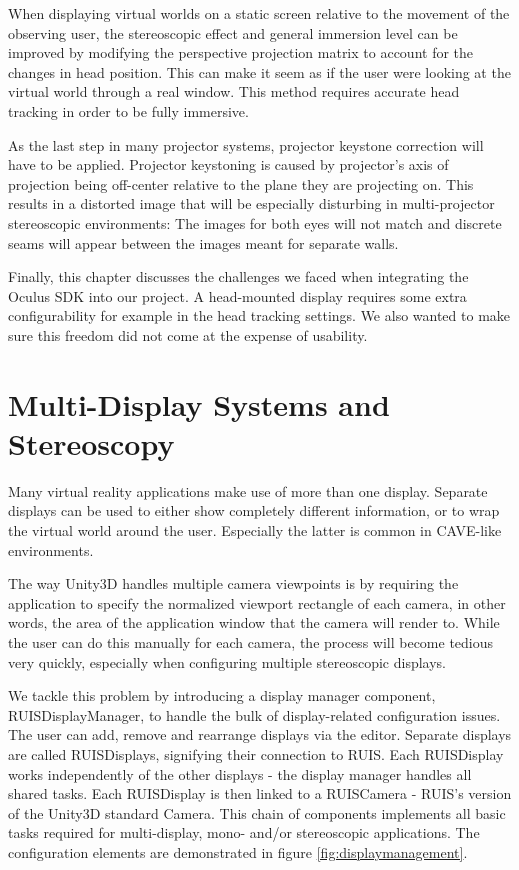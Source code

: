 \documentclass[12pt,a4paper,oneside,pdftex]{report}
\begin{document}
When displaying virtual worlds on a static screen relative to the movement of the observing user, the stereoscopic effect and general immersion level can be improved by modifying the perspective projection matrix to account for the changes in head position. This can make it seem as if the user were looking at the virtual world through a real window. This method requires accurate head tracking in order to be fully immersive.

As the last step in many projector systems, projector keystone correction will have to be applied. Projector keystoning is caused by projector's axis of projection being off-center relative to the plane they are projecting on. This results in a distorted image that will be especially disturbing in multi-projector stereoscopic environments: The images for both eyes will not match and discrete seams will appear between the images meant for separate walls.

Finally, this chapter discusses the challenges we faced when integrating the Oculus SDK into our project. A head-mounted display requires some extra configurability for example in the head tracking settings. We also wanted to make sure this freedom did not come at the expense of usability.

\section{Multi-Display Systems and Stereoscopy}
\label{section:multidisplaysystems}

Many virtual reality applications make use of more than one display. Separate displays can be used to either show completely different information, or to wrap the virtual world around the user. Especially the latter is common in CAVE-like environments.

The way Unity3D handles multiple camera viewpoints is by requiring the application to specify the normalized viewport rectangle of each camera, in other words, the area of the application window that the camera will render to. While the user can do this manually for each camera, the process will become tedious very quickly, especially when configuring multiple stereoscopic displays. 

We tackle this problem by introducing a display manager component, RUISDisplayManager, to handle the bulk of display-related configuration issues. The user can add, remove and rearrange displays via the editor. Separate displays are called RUISDisplays, signifying their connection to RUIS. Each RUISDisplay works independently of the other displays - the display manager handles all shared tasks. Each RUISDisplay is then linked to a RUISCamera - RUIS's version of the Unity3D standard Camera. This chain of components implements all basic tasks required for multi-display, mono- and/or stereoscopic applications. The configuration elements are demonstrated in figure \ref{fig:displaymanagement}.
\end{document}
